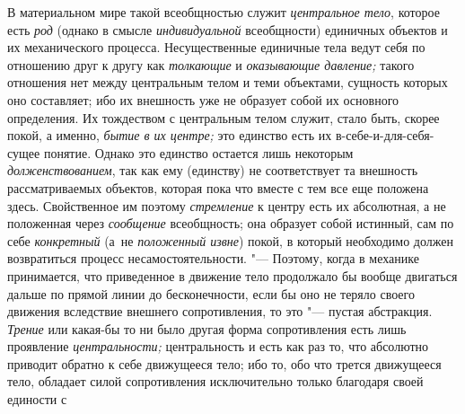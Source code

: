 В материальном мире такой всеобщностью служит
{\em центральное тело},
которое есть {\em род}
(однако в смысле
{\em индивидуальной}
всеобщности) единичных объектов и их механического процесса.
Несущественные единичные тела ведут себя по отношению друг к другу как
{\em толкающие} и
{\em оказывающие давление;}
такого отношения нет между центральным телом и теми
объектами, сущность которых оно составляет; ибо их внешность уже не
образует собой их основного определения. Их тождеством с центральным телом
служит, стало быть, скорее покой, а именно,
{\em бытие в их центре;}
это единство есть их в-себе-и-для-себя-сущее понятие. Однако
это единство остается лишь некоторым
{\em долженствованием},
так как ему (единству) не соответствует та внешность
рассматриваемых объектов, которая пока что вместе с тем все еще положена
здесь. Свойственное им поэтому
{\em стремление} к центру
есть их абсолютная, а не положенная через
{\em сообщение}
всеобщность; она образует собой истинный, сам по себе
{\em конкретный} (а~не
{\em положенный извне})
покой, в который необходимо должен возвратиться процесс
несамостоятельности. "--- Поэтому, когда в механике
принимается, что приведенное в движение тело продолжало бы вообще двигаться
дальше по прямой линии до бесконечности, если бы оно не теряло своего
движения вследствие внешнего сопротивления, то это "--- пустая
абстракция. {\em Трение}
или какая-бы то ни было другая форма
сопротивления есть лишь проявление
{\em центральности;}
центральность и есть как раз то, что абсолютно приводит
обратно к себе движущееся тело; ибо то, обо что трется движущееся тело,
обладает силой сопротивления исключительно только благодаря своей единости
с
